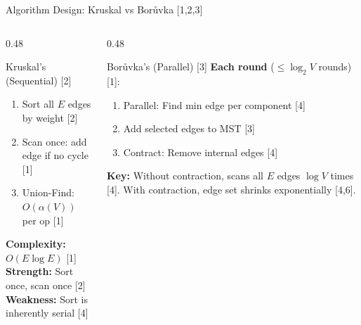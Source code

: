 \documentclass[aspectratio=169, 11pt]{beamer}
\begin{document}
\begin{frame}{Algorithm Design: Kruskal vs Bor\r{u}vka [1,2,3]}
\begin{columns}[T]
\begin{column}{0.48\textwidth}
\begin{block}{Kruskal's (Sequential) [2]}
\begin{enumerate}
    \item Sort all $E$ edges by weight [2]
    \item Scan once: add edge if no cycle [1]
    \item Union-Find: $O(\alpha(V))$ per op [1]
\end{enumerate}
\textbf{Complexity:} $O(E \log E)$ [1]\\
\textbf{Strength:} Sort once, scan once [2]\\
\textbf{Weakness:} Sort is inherently serial [4]
\end{block}
\end{column}
\begin{column}{0.48\textwidth}
\begin{block}{Bor\r{u}vka's (Parallel) [3]}
\textbf{Each round} ($\leq \log_2 V$ rounds) [1]:
\begin{enumerate}
    \item {\color{kaugreen}Parallel:} Find min edge per component [4]
    \item Add selected edges to MST [3]
    \item {\color{clr2}Contract:} Remove internal edges [4]
\end{enumerate}
\textbf{Key:} Without contraction, scans all $E$ edges $\log V$ times [4]. With contraction, edge set shrinks exponentially [4,6].
\end{block}
\end{column}
\end{columns}
\end{frame}
\end{document}
